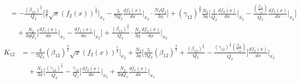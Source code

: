 \documentclass[fleqn, 10pt]{article}
\begin{document}
\begin{equation*}
\begin{split}
  & = - \frac{(\beta_{12})^\frac{3}{2}}{Q_{2}}   \biggl[ \frac{4}{7} \sqrt{x} (f_{2}(x))^\frac{5}{2} \Bigg|_{x_{2}} - \frac{5}{7Q_{2}}   \frac{df_{2}(x)}{dx} \Bigg|_{x_{2}} \cdot \frac{N_{2} Q_{2}}{3 \eta} \biggr] + (\gamma_{1\overline{2}})^\frac{3}{2} \frac{N_{2}}{3 \eta} \biggl[ \frac{1}{\overline{Q_{2}}}   \frac{d\overline{f_{2}(x)}}{dx} \Bigg|_{\overline{x_{2}}} - \frac{\left( \frac{\beta_{12}}{\gamma_{1\overline{2}}}\right)}{\overline{Q_{2}}}   \frac{df_{2}(x)}{dx} \Bigg|_{x_{2}}  \biggr] \\ & \quad  + \frac{N_{2}}{3 \eta Q_{1}}   \biggl[ \frac{df_{1}(x)}{dx} \Bigg|_{x_{1}} -   \frac{df_{1}(x)}{dx} \Bigg|_{\overline{x_{2}}} \biggr] + \frac{(\beta_{12})^\frac{3}{2}}{Q_{2}} \cdot \frac{N_{2}}{3 \eta}   \frac{df_{2}(x)}{dx} \Bigg|_{x_{2}}
    \end{split}
\end{equation*}
\begin{equation}
\begin{split}
  K_{12}  &= -   \frac{4}{7 Q_{2}} (\beta_{12})^\frac{3}{2} \sqrt{x} (f_{2}(x))^\frac{5}{2} \Bigg|_{x_{2}} + \frac{N_{2}}{3 \eta} \biggl[ \frac{5}{7 Q_{2}} (\beta_{12})^\frac{3}{2} + \frac{(\beta_{12})^\frac{3}{2}}{Q_{2}} - \frac{(\gamma_{1\overline{2}})^\frac{3}{2} \left( \frac{\beta_{12}}{\gamma_{1\overline{2}}}\right)}{\overline{Q_{2}}} \biggr]   \frac{df_{2}(x)}{dx} \Bigg|_{x_{2}} \\ & \quad + \frac{N_{2}}{3 \eta} \biggl[ \frac{(\gamma_{1\overline{2}})^\frac{3}{2}}{\overline{Q_{2}}} - \frac{\gamma_{1\overline{2}}}{Q_{1}}  \biggr]   \frac{d\overline{f_{2}(x)}}{dx} \Bigg|_{\overline{x_{2}}} + \frac{N_{2}}{3 \eta Q_{1}}   \frac{df_{1}(x)}{dx} \Bigg|_{x_{1}}
  \end{split}
\end{equation}
\end{document}
